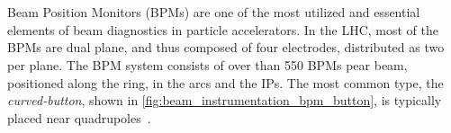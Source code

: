 \section{}


\subsection{}

Beam Position Monitors (BPMs) are one of the most utilized and essential elements of beam 
diagnostics in particle accelerators. In the LHC, most of the BPMs are dual plane, and thus composed
of four electrodes, distributed as two per plane. The BPM system consists of over than 550 BPMs pear
beam, positioned along the ring, in the arcs and the IPs. The most common type, the
\textit{curved-button}, shown in \cref{fig:beam_instrumentation_bpm_button}, is typically placed
near quadrupoles~\cite{wendt_bpm_2020}.


